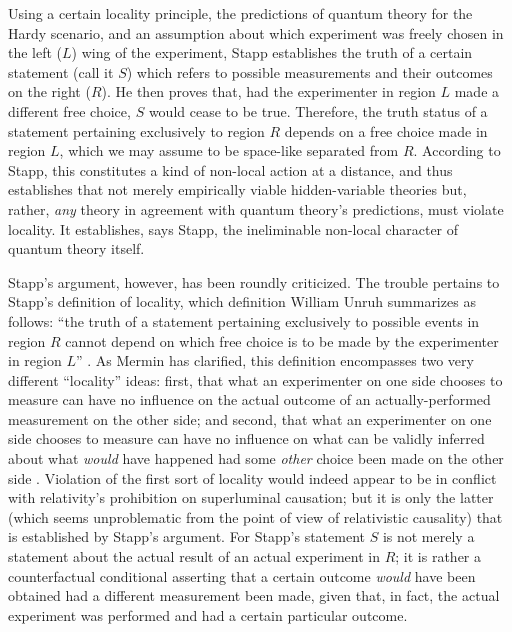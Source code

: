 \documentclass[aps,prc,onecolumn,12pt,nofootinbib]{revtex4-2}
\begin{document}
Using a certain locality principle, the predictions of quantum
theory for the Hardy
scenario, and an assumption about which experiment was freely chosen
in the left ($L$) wing of the experiment, Stapp establishes the truth
of a certain statement (call it $S$) which refers to possible
measurements and their outcomes on the right ($R$).
He then proves that, had the
experimenter in region $L$ made a different free choice, $S$ would
cease to be true.  Therefore, the truth status of a statement pertaining
exclusively to region $R$ depends on a free choice made in region $L$,
which we may assume to be space-like separated from $R$.  According to
Stapp, this constitutes a kind of non-local action at a distance, and
thus establishes that not merely empirically viable hidden-variable
theories but, rather, \emph{any} theory in agreement with quantum
theory's
predictions, must violate locality.  It establishes, says Stapp, the
ineliminable non-local character of quantum theory itself.

Stapp's argument, however, has been roundly criticized.  The trouble
pertains to Stapp's definition of locality, which definition William
Unruh summarizes as follows:  ``the
truth of a statement pertaining exclusively to possible events in
region $R$ cannot depend on which free choice is to be made by the
experimenter in region $L$''  \cite{unruh}.
As Mermin has clarified, this definition encompasses
two very different ``locality'' ideas:  first, that what
an experimenter on one side chooses to measure can have no influence
on the actual outcome of an actually-performed measurement on the
other side; and second, that what an experimenter on one side chooses to
measure can have no influence on what can be validly inferred about
what \emph{would} have happened had some \emph{other} choice been made
on the other side \cite{mermin}.  Violation of the first sort of
locality would indeed appear to be in
conflict with relativity's prohibition on superluminal causation; but
it is only the latter (which seems unproblematic from the point of
view of relativistic causality) that is established by Stapp's
argument.   For Stapp's statement $S$ is not merely a statement about the
actual result of an actual experiment in $R$; it is rather a
counterfactual conditional asserting that a certain outcome
\emph{would} have been obtained had a different measurement been made,
given that, in fact, the actual experiment was performed and had a
certain particular outcome.
\end{document}
